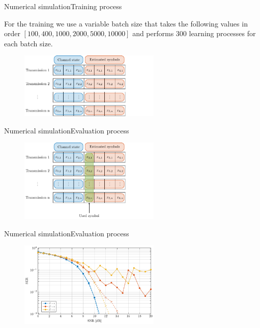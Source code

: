 \documentclass[en]{sdqbeamer}
\begin{document}
\begin{frame}{Numerical simulation}{Training process}

For the training we use a variable batch size that takes the following values in order $[100, 400, 1000, 2000, 5000, 10000]$ and performs 300 learning processes for each batch size.

\begin{figure}[!ht]
\begin{center}
\includegraphics[width=0.6\textwidth]{train_normal.pdf}
\end{center}
\end{figure}

\end{frame}


\begin{frame}{Numerical simulation}{Evaluation process}

\begin{figure}[!ht]
\begin{center}
\includegraphics[width=0.6\textwidth]{eval_normal.pdf}
\end{center}
\end{figure}

\end{frame}


\begin{frame}{Numerical simulation}{Evaluation process}

\begin{figure}[!ht]
\begin{center}
\includegraphics[width=0.6\textwidth]{SER_normal_test.pdf}
\end{center}
\end{figure}
\end{frame}
\end{document}
